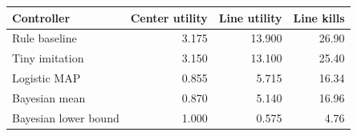 \begin{tabular}{lrrr}
\toprule
Controller & Center utility & Line utility & Line kills \\
\midrule
Rule baseline & 3.175 & 13.900 & 26.90 \\
Tiny imitation & 3.150 & 13.100 & 25.40 \\
Logistic MAP & 0.855 & 5.715 & 16.34 \\
Bayesian mean & 0.870 & 5.140 & 16.96 \\
Bayesian lower bound & 1.000 & 0.575 & 4.76 \\
\bottomrule
\end{tabular}
